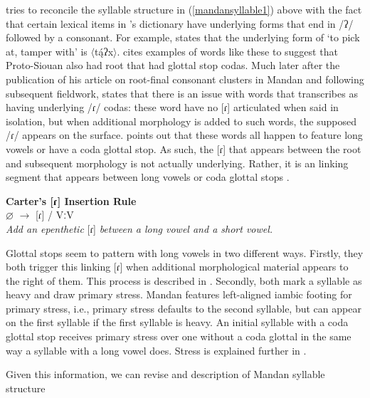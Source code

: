 \citet{carter1983} tries to reconcile the syllable structure in (\ref{mandansyllable1}) above with the fact that certain lexical items in \citeauthor{hollow1970}'s dictionary have underlying forms that end in /ʔ/ followed by a consonant. For example, \citet[246]{hollow1970} states that the underlying form of `to pick at, tamper with' is $\langle$tą́ʔx$\rangle$. \citeauthor{carter1991a} cites examples of words like these to suggest that Proto-Siouan also had root that had glottal stop codas. Much later after the publication of his article on root-final consonant clusters in Mandan and following subsequent fieldwork, \citeauthor{carter1991a} states that there is an issue with words that \citeauthor{hollow1970} transcribes as having underlying /ɾ/ codas: these word have no [ɾ] articulated when said in isolation, but when additional morphology is added to such words, the supposed /ɾ/ appears on the surface. \citet{carter1991a} points out that these words all happen to feature long vowels or have a coda glottal stop. As such, the [ɾ] that appears between the root and subsequent morphology is not actually underlying. Rather, it is an linking segment that appears between long vowels or coda glottal stops \citep[487]{carter1991a}.

\begin{exe}

\item\label{cartersyllablerule} \textbf{Carter's [ɾ] Insertion Rule}\\
	$\varnothing$ $\to$ [ɾ] / Vː{\longrule}V\\
	\textit{Add an epenthetic} [ɾ] \textit{between a long vowel and a short vowel.}

\end{exe}

Glottal stops seem to pattern with long vowels in two different ways. Firstly, they both trigger this linking [ɾ] when additional morphological material appears to the right of them. This process is described in . Secondly, both mark a syllable as heavy and draw primary stress. Mandan features left-aligned iambic footing for primary stress, i.e., primary stress defaults to the second syllable, but can appear on the first syllable if the first syllable is heavy. An initial syllable with a coda glottal stop receives primary stress over one without a coda glottal in the same way a syllable with a long vowel does. Stress is explained further in .

Given this information, we can revise \citet{hollow1970} and  description of Mandan syllable structure

